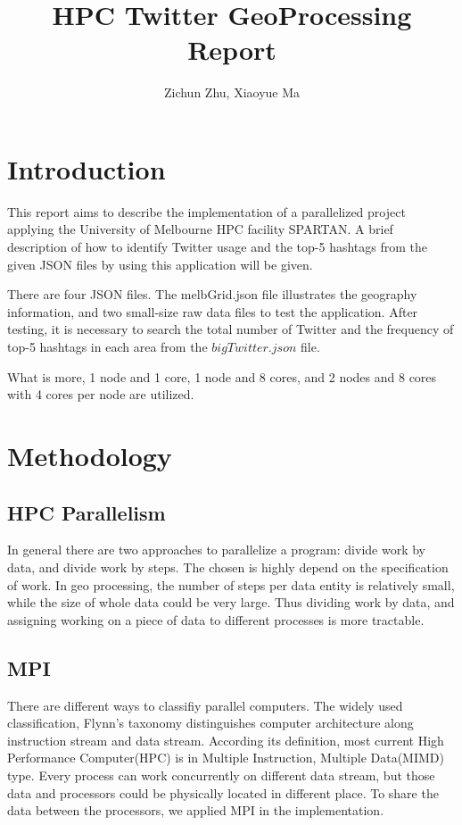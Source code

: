 \documentclass[11pt]{article}
\title{HPC Twitter GeoProcessing Report}
\author
{Zichun Zhu, Xiaoyue Ma}
\begin{document}
\maketitle


\section{Introduction}
This report aims to describe the implementation of a parallelized project applying the University of Melbourne HPC facility SPARTAN. A brief description of how to identify Twitter usage and the top-5 hashtags from the given JSON files by using this application will be given.

There are four JSON files. The melbGrid.json file illustrates the geography information, and two small-size raw data files to test the application. After testing, it is necessary to search the total number of Twitter and the frequency of top-5 hashtags in each area from the $bigTwitter.json$ file.

What is more, 1 node and 1 core, 1 node and 8 cores, and 2 nodes and 8 cores with 4 cores per node are utilized.

\section{Methodology}

\subsection{HPC Parallelism}
In general there are two approaches to parallelize a program: divide work by data, and divide work by steps. The chosen is highly depend on the specification of work. In geo processing, the number of steps per data entity is relatively small, while the size of whole data could be very large. Thus dividing work by data, and assigning working on a piece of data to different processes is more tractable.

\subsection{MPI}
There are different ways to classifiy parallel computers. The widely used classification, Flynn's taxonomy distinguishes computer architecture along instruction stream and data stream. According its definition, most current High Performance Computer(HPC) is in Multiple Instruction, Multiple Data(MIMD) type. Every process can work concurrently on different data stream, but those data and processors could be physically located in different place. To share the data between the processors,  we applied MPI in the implementation.
\end{document}
